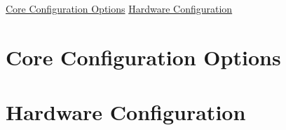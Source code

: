 \hyperlink{core_configuration_options}{Core Configuration Options} \hyperlink{hardware_configuration}{Hardware Configuration} \hypertarget{core_configuration_options}{}\section{Core Configuration Options}\label{core_configuration_options}
\hypertarget{hardware_configuration}{}\section{Hardware Configuration}\label{hardware_configuration}
